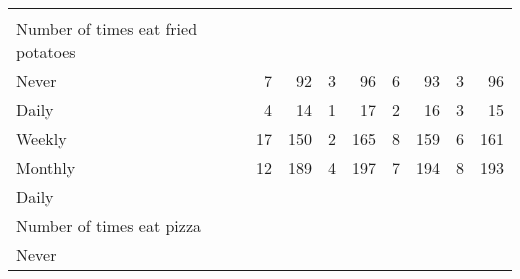 \documentclass{article}
\begin{document}
\begin{tabular}{lllllllll}
  \multicolumn{1}{r}{} \\
\multicolumn{1}{l}{\hspace{4em}Number of times eat fried potatoes} &
  \multicolumn{1}{|r}{} &
  \multicolumn{1}{r}{} &
  \multicolumn{1}{r}{} &
  \multicolumn{1}{r}{} &
  \multicolumn{1}{r}{} &
  \multicolumn{1}{r}{} &
  \multicolumn{1}{r}{} &
  \multicolumn{1}{r}{} \\
\multicolumn{1}{l}{\hspace{5em}Never} &
  \multicolumn{1}{|r}{7} &
  \multicolumn{1}{r}{92} &
  \multicolumn{1}{r}{3} &
  \multicolumn{1}{r}{96} &
  \multicolumn{1}{r}{6} &
  \multicolumn{1}{r}{93} &
  \multicolumn{1}{r}{3} &
  \multicolumn{1}{r}{96} \\
\multicolumn{1}{l}{\hspace{5em}Daily} &
  \multicolumn{1}{|r}{4} &
  \multicolumn{1}{r}{14} &
  \multicolumn{1}{r}{1} &
  \multicolumn{1}{r}{17} &
  \multicolumn{1}{r}{2} &
  \multicolumn{1}{r}{16} &
  \multicolumn{1}{r}{3} &
  \multicolumn{1}{r}{15} \\
\multicolumn{1}{l}{\hspace{5em}Weekly} &
  \multicolumn{1}{|r}{17} &
  \multicolumn{1}{r}{150} &
  \multicolumn{1}{r}{2} &
  \multicolumn{1}{r}{165} &
  \multicolumn{1}{r}{8} &
  \multicolumn{1}{r}{159} &
  \multicolumn{1}{r}{6} &
  \multicolumn{1}{r}{161} \\
\multicolumn{1}{l}{\hspace{5em}Monthly} &
  \multicolumn{1}{|r}{12} &
  \multicolumn{1}{r}{189} &
  \multicolumn{1}{r}{4} &
  \multicolumn{1}{r}{197} &
  \multicolumn{1}{r}{7} &
  \multicolumn{1}{r}{194} &
  \multicolumn{1}{r}{8} &
  \multicolumn{1}{r}{193} \\
\multicolumn{1}{l}{\hspace{1em}Daily} &
  \multicolumn{1}{|r}{} &
  \multicolumn{1}{r}{} &
  \multicolumn{1}{r}{} &
  \multicolumn{1}{r}{} &
  \multicolumn{1}{r}{} &
  \multicolumn{1}{r}{} &
  \multicolumn{1}{r}{} &
  \multicolumn{1}{r}{} \\
\multicolumn{1}{l}{\hspace{2em}Number of times eat pizza} &
  \multicolumn{1}{|r}{} &
  \multicolumn{1}{r}{} &
  \multicolumn{1}{r}{} &
  \multicolumn{1}{r}{} &
  \multicolumn{1}{r}{} &
  \multicolumn{1}{r}{} &
  \multicolumn{1}{r}{} &
  \multicolumn{1}{r}{} \\
\multicolumn{1}{l}{\hspace{3em}Never} &
  \multicolumn{1}{|r}{} &
  \multicolumn{1}{r}{} &
  \multicolumn{1}{r}{} &
  \multicolumn{1}{r}{} &

\end{tabular}
\end{document}
